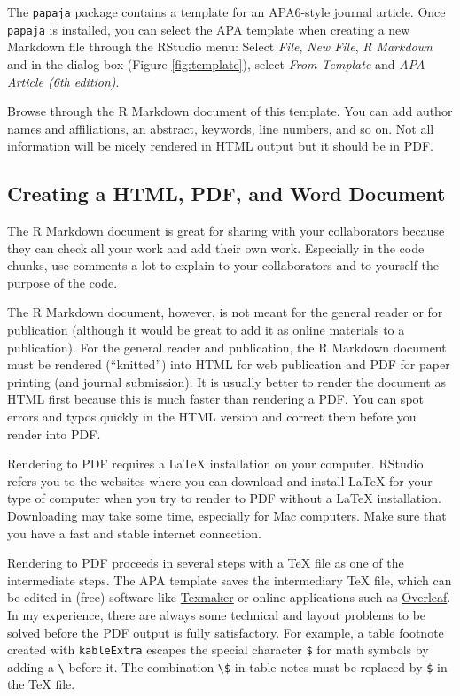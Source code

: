 \documentclass[doc,floatsintext]{apa6}
\begin{document}
The \texttt{papaja} package contains a template for an APA6-style
journal article. Once \texttt{papaja} is installed, you can select the
APA template when creating a new Markdown file through the RStudio menu:
Select \emph{File}, \emph{New File}, \emph{R Markdown} and in the dialog
box (Figure \ref{fig:template}), select \emph{From Template} and
\emph{APA Article (6th edition)}.

Browse through the R Markdown document of this template. You can add
author names and affiliations, an abstract, keywords, line numbers, and
so on. Not all information will be nicely rendered in HTML output but it
should be in PDF.

\subsection{Creating a HTML, PDF, and Word
Document}\label{creating-a-html-pdf-and-word-document}

The R Markdown document is great for sharing with your collaborators
because they can check all your work and add their own work. Especially
in the code chunks, use comments a lot to explain to your collaborators
and to yourself the purpose of the code.

The R Markdown document, however, is not meant for the general reader or
for publication (although it would be great to add it as online
materials to a publication). For the general reader and publication, the
R Markdown document must be rendered (\enquote{knitted}) into HTML for
web publication and PDF for paper printing (and journal submission). It
is usually better to render the document as HTML first because this is
much faster than rendering a PDF. You can spot errors and typos quickly
in the HTML version and correct them before you render into PDF.

Rendering to PDF requires a LaTeX installation on your computer. RStudio
refers you to the websites where you can download and install LaTeX for
your type of computer when you try to render to PDF without a LaTeX
installation. Downloading may take some time, especially for Mac
computers. Make sure that you have a fast and stable internet
connection.

Rendering to PDF proceeds in several steps with a TeX file as one of the
intermediate steps. The APA template saves the intermediary TeX file,
which can be edited in (free) software like
\href{https://www.xm1math.net/texmaker/}{Texmaker} or online
applications such as \href{https://www.overleaf.com/}{Overleaf}. In my
experience, there are always some technical and layout problems to be
solved before the PDF output is fully satisfactory. For example, a table
footnote created with \texttt{kableExtra} escapes the special character
\texttt{\$} for math symbols by adding a \texttt{\textbackslash{}}
before it. The combination \texttt{\textbackslash{}\$} in table notes
must be replaced by \texttt{\$} in the TeX file.
\end{document}
